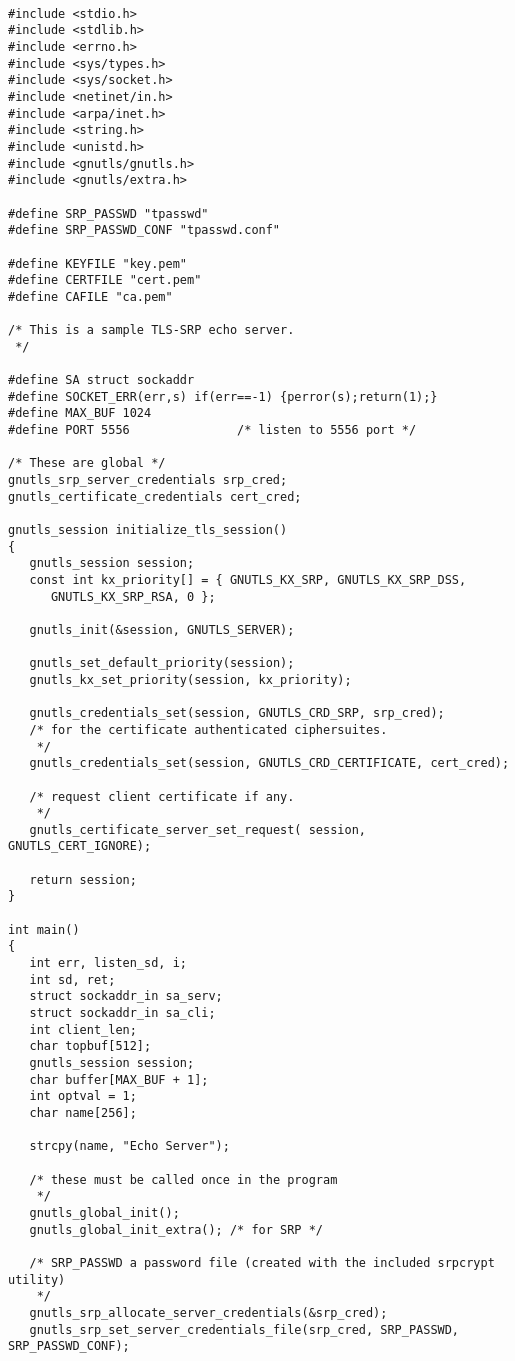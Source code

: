 \begin{verbatim}

#include <stdio.h>
#include <stdlib.h>
#include <errno.h>
#include <sys/types.h>
#include <sys/socket.h>
#include <netinet/in.h>
#include <arpa/inet.h>
#include <string.h>
#include <unistd.h>
#include <gnutls/gnutls.h>
#include <gnutls/extra.h>

#define SRP_PASSWD "tpasswd"
#define SRP_PASSWD_CONF "tpasswd.conf"

#define KEYFILE "key.pem"
#define CERTFILE "cert.pem"
#define CAFILE "ca.pem"

/* This is a sample TLS-SRP echo server.
 */

#define SA struct sockaddr
#define SOCKET_ERR(err,s) if(err==-1) {perror(s);return(1);}
#define MAX_BUF 1024
#define PORT 5556               /* listen to 5556 port */

/* These are global */
gnutls_srp_server_credentials srp_cred;
gnutls_certificate_credentials cert_cred;

gnutls_session initialize_tls_session()
{
   gnutls_session session;
   const int kx_priority[] = { GNUTLS_KX_SRP, GNUTLS_KX_SRP_DSS,
      GNUTLS_KX_SRP_RSA, 0 };

   gnutls_init(&session, GNUTLS_SERVER);

   gnutls_set_default_priority(session);
   gnutls_kx_set_priority(session, kx_priority);

   gnutls_credentials_set(session, GNUTLS_CRD_SRP, srp_cred);
   /* for the certificate authenticated ciphersuites.
    */
   gnutls_credentials_set(session, GNUTLS_CRD_CERTIFICATE, cert_cred);

   /* request client certificate if any.
    */
   gnutls_certificate_server_set_request( session, GNUTLS_CERT_IGNORE);

   return session;
}

int main()
{
   int err, listen_sd, i;
   int sd, ret;
   struct sockaddr_in sa_serv;
   struct sockaddr_in sa_cli;
   int client_len;
   char topbuf[512];
   gnutls_session session;
   char buffer[MAX_BUF + 1];
   int optval = 1;
   char name[256];

   strcpy(name, "Echo Server");

   /* these must be called once in the program
    */
   gnutls_global_init();
   gnutls_global_init_extra(); /* for SRP */

   /* SRP_PASSWD a password file (created with the included srpcrypt utility) 
    */
   gnutls_srp_allocate_server_credentials(&srp_cred);
   gnutls_srp_set_server_credentials_file(srp_cred, SRP_PASSWD, SRP_PASSWD_CONF);


\end{verbatim}
